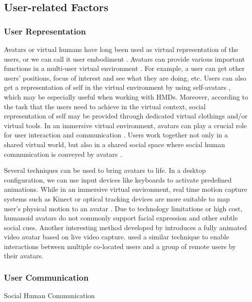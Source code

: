 \subsection{User-related Factors}

\subsubsection{User Representation}
Avatars or virtual humans have long been used as virtual representation of the users, or we can call it user embodiment \citep{Benford1995UEC}. Avatars can provide various important functions in a multi-user virtual environment \citep{Thalmann2001VHR}. For example, a user can get other users' positions, focus of interest and see what they are doing, etc. Users can also get a representation of self in the virtual environment by using self-avatars \citep{Lok2003Effects}, which may be especially useful when working with HMDs. Moreover, according to the task that the users need to achieve in the virtual context, social representation of self may be provided through dedicated virtual clothings and/or virtual tools. In an immersive virtual environment, avatars can play a crucial role for user interaction and communication \citep{Slater1994Body}. Users work together not only in a shared virtual world, but also in a shared social space where social human communication is conveyed by avatars \citep{Roberts2004SSH}.

Several techniques can be used to bring avatars to life. In a desktop configuration, we can use input devices like keyboards to activate predefined animations. While in an immersive virtual environment, real time motion capture systems such as Kinect or optical tracking devices are more suitable to map user's physical motion to an avatar \citep{Mohler2010Effect, Vera2011AugMir, Normand2012FBA}. Due to technology limitations or high cost, humanoid avatars do not commonly support facial expression and other subtle social cues. Another interesting method developed by \citet{Ogi2001SteAva} introduces a fully animated video avatar based on live video capture. \citet{Beck2013IGG} used a similar technique to enable interactions between multiple co-located users and a group of remote users by their avatars.

\subsubsection{User Communication}
Social Human Communication

